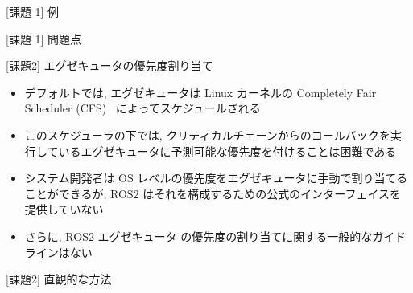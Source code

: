 \begin{frame}{[課題 1] 例}
\end{frame}

\begin{frame}{[課題 1] 問題点}
\end{frame}

\begin{frame}{[課題2] エグゼキュータの優先度割り当て}
    \begin{itemize}
        \item デフォルトでは, エグゼキュータは Linux カーネルの Completely Fair Scheduler (CFS)~\cite{wong2008fairness} によってスケジュールされる
        \item このスケジューラの下では, クリティカルチェーンからのコールバックを実行しているエグゼキュータに予測可能な優先度を付けることは困難である
        \item システム開発者は OS レベルの優先度をエグゼキュータに手動で割り当てることができるが, ROS2 はそれを構成するための公式のインターフェイスを提供していない
        \item さらに, ROS2 エグゼキュータ の優先度の割り当てに関する一般的なガイドラインはない
    \end{itemize}
\end{frame}

\begin{frame}{[課題2] 直観的な方法}
\end{frame}


